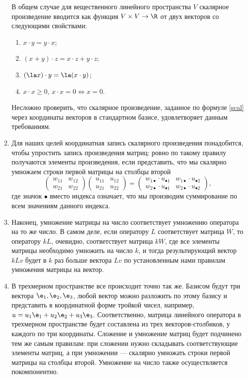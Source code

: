 \begin{enumerate}
В общем случае для вещественного линейного пространства $V$ скалярное произведение вводится как функция $V\times V\to\R$ от двух векторов со следующими свойствами:
\begin{enumerate}[{\bfseries SP}1]
\item $x\cdot y=y\cdot x$;
\item $(x+y)\cdot z = x\cdot z + y\cdot z$;
\item $(\la x)\cdot y = \la(x\cdot y)$;
\item $x\cdot x\ge 0$, $x\cdot x=0\Leftrightarrow x=0$.
\end{enumerate}
Несложно проверить, что скалярное произведение, заданное по формуле \eqref{scal} через координаты векторов в стандартном базисе, удовлетворяет данным требованиям.
\item Для наших целей координатная запись скалярного произведения понадобится, чтобы упростить запись произведения матриц: ровно по такому правилу получаются элементы произведения, если представить, что мы скалярно умножаем строки первой матрицы на столбцы второй
$$
\begin{pmatrix}
w_{11} & w_{12} \\ w_{21} & w_{22}
\end{pmatrix}
\begin{pmatrix}
u_{11} & u_{12} \\ u_{21} & u_{22}
\end{pmatrix}
=
\begin{pmatrix}
w_{1\bullet}\cdot u_{\bullet 1} & w_{1\bullet}\cdot u_{\bullet 2} \\ 
w_{2\bullet}\cdot u_{\bullet 1} & w_{2\bullet}\cdot u_{\bullet 2}
\end{pmatrix},
$$
где значок $\bullet$ вместо индекса означает, что мы производим суммирование по всем значениям данного индекса.

\item Наконец, умножение матрицы на число соответствует умножению оператора на то же число. В самом деле, если оператору $L$ соответствует матрица $W$, то оператору $kL$, очевидно, соответствует матрица $kW$, где все элементы матрицы необходимо умножить на число $k$, и тогда результирующий вектор $kLv$ будет в $k$ раз больше вектора $Lv$ по установленным нами правилам умножения матрицы на вектор.

\item В трехмерном пространстве все происходит точно так же. Базисом будут три вектора $\e_1,\e_2,\e_3$, любой вектор можно разложить по этому базису и представить в координатной форме тройкой чисел, например, $u=u_1\e_1+u_2\e_2+u_3\e_3$. Соответственно, матрица линейного оператора в трехмерном пространстве будет составлена из трех векторов-столбиков, у каждого по три координаты. Сложение и умножение матриц будет подчинено тем же самым правилам: при сложении нужно складывать соответствующие элементы матриц, а при умножении --- скалярно умножать строки первой матрицы на столбцы второй. Умножение на число также осуществляется покомпонентно.


\end{enumerate}
